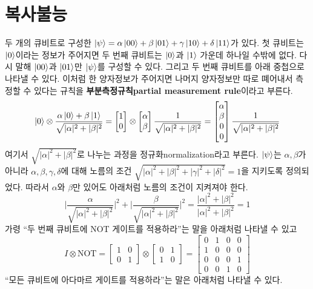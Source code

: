 \documentclass[a4paper,chapter,atbegshi]{oblivoir}
\begin{document}
\chapter{복사불능}
두 개의 큐비트로 구성한 $\ket{\psi} = \alpha\ket{00}+\beta\ket{01}+
\gamma\ket{10}+\delta\ket{11}$가 있다. 
첫 큐비트는 $\ket0$이라는 정보가 주어지면 두 번째
큐비트는 $\ket0$과 $\ket1$ 가운데 하나일 수밖에 없다.
다시 말해 $\ket{00}$과 $\ket{01}$만 $\ket{\psi}$를 구성할 수 있다.
그리고 두 번째 큐비트를 아래 중첩으로
나타낼 수 있다. 이처럼 한 양자정보가 주어지면 나머지 양자정보만
따로 뗴어내서 측정할 수 있다는 규칙을 
\textbf{부분측정규칙\tiny partial measurement rule}이라고 부른다.
\begin{equation}\label{eq:2-1}
  \ket0\otimes\frac{\alpha\ket0+\beta\ket1}{\sqrt{|\alpha|^2+|\beta|^2}}
  = \begin{bmatrix}1\\0\end{bmatrix}\otimes
  \begin{bmatrix}\alpha\\\beta\end{bmatrix}\frac{1}{\sqrt{|\alpha|^2+|\beta|^2}}
  = \begin{bmatrix}\alpha\\\beta\\0\\0\end{bmatrix}\frac{1}{\sqrt{|\alpha|^2+|\beta|^2}}
\end{equation}
여기서 $\sqrt{|\alpha|^2+|\beta|^2}$로 나누는 과정을 
정규화{\tiny normalization}라고
부른다. $\ket{\psi}$는 $\alpha,\beta$가 아니라 $\alpha,\beta,\gamma,\delta$에
대해 노름의 조건 $\sqrt{|\alpha|^2+|\beta|^2+|\gamma|^2+|\delta|^2}=1$을 지키도록
정의되었다. 따라서 $\alpha$와 $\beta$만 있어도 아래처럼 노름의 조건이 
지켜져야 한다. 
\[
  \Bigg\lvert\frac{\alpha}{\sqrt{|\alpha|^2+|\beta|^2}}\Bigg\rvert^2 +
  \Bigg\lvert\frac{\beta}{\sqrt{|\alpha|^2+|\beta|^2}}\Bigg\rvert^2
  =
  \frac{|\alpha|^2+|\beta|^2}{|\alpha|^2+|\beta|^2}=1
\]
가령 ``두 번째 큐비트에 NOT 게이트를 적용하라''는
말을 아래처럼 나타낼 수 있고
\[
  I\otimes \textrm{NOT} = \begin{bmatrix}1 & 0 \\ 0 & 1\end{bmatrix}
  \otimes \begin{bmatrix}0 & 1 \\ 1 & 0\end{bmatrix}=
  \begin{bmatrix}0&1&0&0\\1&0&0&0\\0&0&0&1\\0&0&1&0\end{bmatrix}
\]
``모든 큐비트에 아다마르 게이트를 적용하라''는 말은 아래처럼 나타낼 수 있다.
\end{document}
